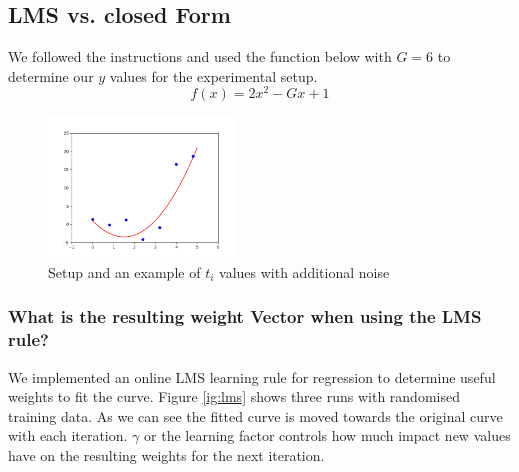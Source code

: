 
\subsection{LMS vs. closed Form}
We followed the instructions and used the  function below with $G = 6$ to determine our $y$ values for the experimental setup.
\begin{equation}
f(x) = 2x^2 - Gx +1
\end{equation}


\begin{figure}[!h]
\begin{center}
\centering
\includegraphics[width=5cm]{setup.png}
\end{center}
\caption{ Setup and an example of $t_i$ values with additional noise}
\end{figure}

\subsubsection{What is the resulting weight Vector when using the LMS rule?}

We implemented an online LMS learning rule for regression to determine useful weights to fit the curve. Figure \ref{ig:lms} shows three runs with randomised training data. As we can see the fitted curve is moved towards the original curve with each iteration. $\gamma$ or the learning factor controls how much impact new values have on the resulting weights for the next iteration. 

